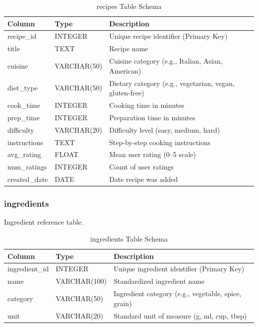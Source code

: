 \documentclass[11pt,a4paper]{article}
\begin{document}
\begin{table}[H]
    \centering
    \begin{tabular}{|p{2.5cm}|p{2cm}|p{8cm}|}
        \hline
        \textbf{Column} & \textbf{Type} & \textbf{Description} \\
        \hline
        recipe\_id & INTEGER & Unique recipe identifier (Primary Key) \\
        \hline
        title & TEXT & Recipe name \\
        \hline
        cuisine & VARCHAR(50) & Cuisine category (e.g., Italian, Asian, American) \\
        \hline
        diet\_type & VARCHAR(50) & Dietary category (e.g., vegetarian, vegan, gluten-free) \\
        \hline
        cook\_time & INTEGER & Cooking time in minutes \\
        \hline
        prep\_time & INTEGER & Preparation time in minutes \\
        \hline
        difficulty & VARCHAR(20) & Difficulty level (easy, medium, hard) \\
        \hline
        instructions & TEXT & Step-by-step cooking instructions \\
        \hline
        avg\_rating & FLOAT & Mean user rating (0--5 scale) \\
        \hline
        num\_ratings & INTEGER & Count of user ratings \\
        \hline
        created\_date & DATE & Date recipe was added \\
        \hline
    \end{tabular}
    \caption{recipes Table Schema}
    \label{tab:recipes_schema}
\end{table}

\subsubsection{ingredients}

Ingredient reference table.

\begin{table}[H]
    \centering
    \begin{tabular}{|p{2.5cm}|p{2cm}|p{8cm}|}
        \hline
        \textbf{Column} & \textbf{Type} & \textbf{Description} \\
        \hline
        ingredient\_id & INTEGER & Unique ingredient identifier (Primary Key) \\
        \hline
        name & VARCHAR(100) & Standardized ingredient name \\
        \hline
        category & VARCHAR(50) & Ingredient category (e.g., vegetable, spice, grain) \\
        \hline
        unit & VARCHAR(20) & Standard unit of measure (g, ml, cup, tbsp) \\
        \hline
    \end{tabular}
    \caption{ingredients Table Schema}
    \label{tab:ingredients_schema}
\end{table}
\end{document}

